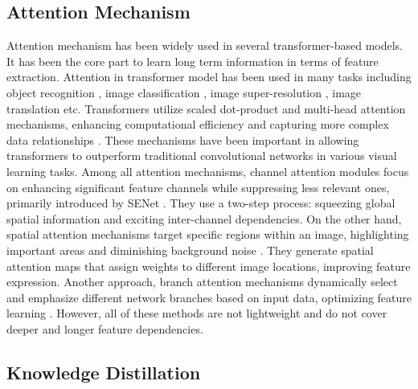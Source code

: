 \subsection{Attention Mechanism}
Attention mechanism has been widely used in several transformer-based models. It has been the core part to learn long term information in terms of feature extraction. Attention in transformer model has been used in many tasks including object recognition \cite{heo2022occlusion}, image classification \cite{wang2021not}, image super-resolution \cite{lu2022transformer}, image translation etc. Transformers utilize scaled dot-product and multi-head attention mechanisms, enhancing computational efficiency and capturing more complex data relationships \cite{fateh2024advancing}. These mechanisms have been important in allowing transformers to outperform traditional convolutional networks in various visual learning tasks. Among all attention mechanisms, channel attention modules focus on enhancing significant feature channels while suppressing less relevant ones, primarily introduced by SENet \cite{hu2018squeeze}. They use a two-step process: squeezing global spatial information and exciting inter-channel dependencies. On the other hand, spatial attention mechanisms target specific regions within an image, highlighting important areas and diminishing background noise \cite{zhu2019empirical}. They generate spatial attention maps that assign weights to different image locations, improving feature expression. Another approach, branch attention mechanisms dynamically select and emphasize different network branches based on input data, optimizing feature learning \cite{fukui2019attention}. However, all of these methods are not lightweight and do not cover deeper and longer feature dependencies. 


\subsection{Knowledge Distillation}


